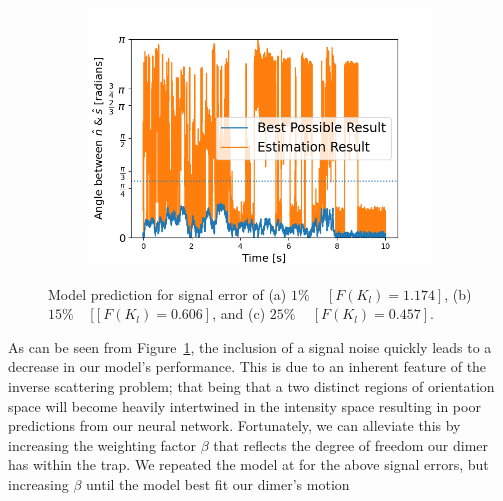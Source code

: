 \documentclass[final,  3p]{elsarticle}
\begin{document}
\begin{figure}[h]
\begin{subfigure}{0.32\textwidth}
		\includegraphics[width=\textwidth]{./Images/fig6c.png}
	\end{subfigure}
	\caption{Model prediction for signal error of (a) $1\%$ ~  $[F(K_l)=1.174]$, (b) $15\%$ ~ [$[F(K_l)=0.606]$, and (c) $25\%$ ~  $[F(K_l)=0.457]$.}
	\label{fig:epsilon}
\end{figure}

As can be seen from Figure~\ref{fig:epsilon}, the inclusion of a signal noise quickly leads to a decrease in our model's performance. This is due to an inherent feature of the inverse scattering problem; that being that a two distinct regions of orientation space will become heavily intertwined in the intensity space resulting in poor predictions from our neural network. Fortunately, we can alleviate this by increasing the weighting factor $\beta$ that reflects the degree of freedom our dimer has within the trap. We repeated the model at for the above signal errors, but increasing $\beta$ until the model best fit our dimer's motion 
\end{document}
